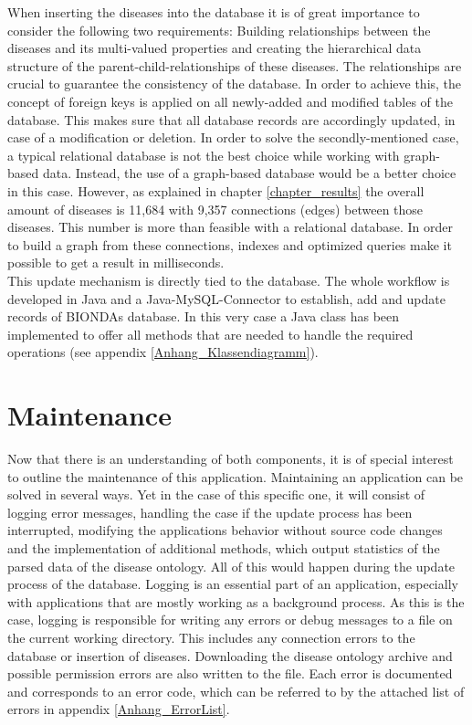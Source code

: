When inserting the diseases into the database it is of great importance to consider the following two requirements:  Building relationships between the diseases and its multi-valued properties and creating the hierarchical data structure of the parent-child-relationships of these diseases. The relationships are crucial to guarantee the consistency of the database. In order to achieve this, the concept of foreign keys is applied on all newly-added and modified tables of the database. This makes sure that all database records are accordingly updated, in case of a modification or deletion. In order to solve the secondly-mentioned case, a typical relational database is not the best choice while working with graph-based data. Instead, the use of a graph-based database would be a better choice in this case. However, as explained in chapter \ref{chapter_results} the overall amount of diseases is 11,684 with 9,357 connections (edges) between those diseases. This number is more than feasible with a relational database. In order to build a graph from these connections, indexes and optimized queries make it possible to get a result in milliseconds. \\

This update mechanism is directly tied to the database. The whole workflow is developed in Java and a Java-MySQL-Connector to establish, add and update records of \ac{BIONDA}s database. In this very case a Java class has been implemented to offer all methods that are needed to handle the required operations (see appendix \ref{Anhang_Klassendiagramm}).

\section{Maintenance}
Now that there is an understanding of both components, it is of special interest to outline the maintenance of this application. Maintaining an application can be solved in several ways. Yet in the case of this specific one, it will consist of logging error messages, handling the case if the update process has been interrupted, modifying the applications behavior without source code changes and the implementation of additional methods, which output statistics of the parsed data of the disease ontology. All of this would happen during the update process of the database. Logging is an essential part of an application, especially with applications that are mostly working as a background process. As this is the case, logging is responsible for writing any errors or debug messages to a file on the current working directory. This includes any connection errors to the database or insertion of diseases. Downloading the disease ontology archive and possible permission errors are also written to the file. Each error is documented and corresponds to an error code, which can be referred to by the attached list of errors in appendix \ref{Anhang_ErrorList}.\\

